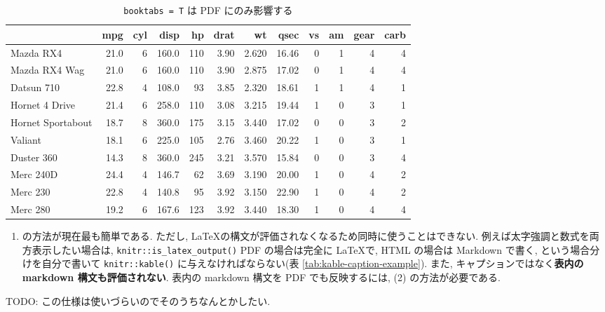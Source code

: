 \documentclass[
]{bxjsbook}
\providecommand{\tightlist}{%
  \setlength{\itemsep}{0pt}\setlength{\parskip}{0pt}}
\theoremstyle{definition}
\theoremstyle{definition}
\theoremstyle{definition}
\theoremstyle{remark}
\begin{document}
\begin{table}

\caption{\label{tab:display-dataframe-kable-booktabs}\texttt{booktabs = T} は PDF にのみ影響する
}
\centering
\begin{tabular}[t]{lrrrrrrrrrrr}
\toprule
  & mpg & cyl & disp & hp & drat & wt & qsec & vs & am & gear & carb\\
\midrule
Mazda RX4 & 21.0 & 6 & 160.0 & 110 & 3.90 & 2.620 & 16.46 & 0 & 1 & 4 & 4\\
Mazda RX4 Wag & 21.0 & 6 & 160.0 & 110 & 3.90 & 2.875 & 17.02 & 0 & 1 & 4 & 4\\
Datsun 710 & 22.8 & 4 & 108.0 & 93 & 3.85 & 2.320 & 18.61 & 1 & 1 & 4 & 1\\
Hornet 4 Drive & 21.4 & 6 & 258.0 & 110 & 3.08 & 3.215 & 19.44 & 1 & 0 & 3 & 1\\
Hornet Sportabout & 18.7 & 8 & 360.0 & 175 & 3.15 & 3.440 & 17.02 & 0 & 0 & 3 & 2\\
\addlinespace
Valiant & 18.1 & 6 & 225.0 & 105 & 2.76 & 3.460 & 20.22 & 1 & 0 & 3 & 1\\
Duster 360 & 14.3 & 8 & 360.0 & 245 & 3.21 & 3.570 & 15.84 & 0 & 0 & 3 & 4\\
Merc 240D & 24.4 & 4 & 146.7 & 62 & 3.69 & 3.190 & 20.00 & 1 & 0 & 4 & 2\\
Merc 230 & 22.8 & 4 & 140.8 & 95 & 3.92 & 3.150 & 22.90 & 1 & 0 & 4 & 2\\
Merc 280 & 19.2 & 6 & 167.6 & 123 & 3.92 & 3.440 & 18.30 & 1 & 0 & 4 & 4\\
\bottomrule
\end{tabular}
\end{table}

\begin{enumerate}
\def\labelenumi{(\arabic{enumi})}
\tightlist
\item
  の方法が現在最も簡単である. ただし,
  \LaTeX の構文が評価されなくなるため同時に使うことはできない.
  例えば太字強調と数式を両方表示したい場合は,
  \texttt{knitr::is\_latex\_output()} PDF の場合は完全に \LaTeX で, HTML
  の場合は Markdown で書く, という場合分けを自分で書いて
  \texttt{knitr::kable()} に与えなければならない(表
  \ref{tab:kable-caption-example}). また,
  キャプションではなく\textbf{表内の markdown 構文も評価されない}.
  表内の markdown 構文を PDF でも反映するには, (2) の方法が必要である.
\end{enumerate}

TODO: この仕様は使いづらいのでそのうちなんとかしたい.
\end{document}
